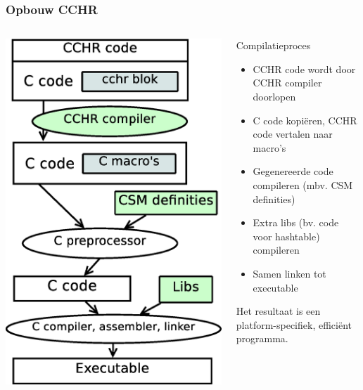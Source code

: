 \documentclass{beamer}
\begin{document}
\begin{frame}[containsverbatim]
  \frametitle{Opbouw CCHR}
  \begin{columns}[c]
  \includegraphics[height=0.83\textheight]{fig/overzicht}
  \begin{block}{Compilatieproces}
    \begin{itemize}
      \item CCHR code wordt door CCHR compiler doorlopen
      \item C code kopi\"eren, CCHR code vertalen naar macro's
      \item Gegenereerde code compileren (mbv. CSM definities)
      \item Extra libs (bv. code voor hashtable) compileren
      \item Samen linken tot executable
    \end{itemize}
    Het resultaat is een platform-specifiek, effici\"ent programma.
  \end{block}
  \end{columns}
\end{frame}
\end{document}
